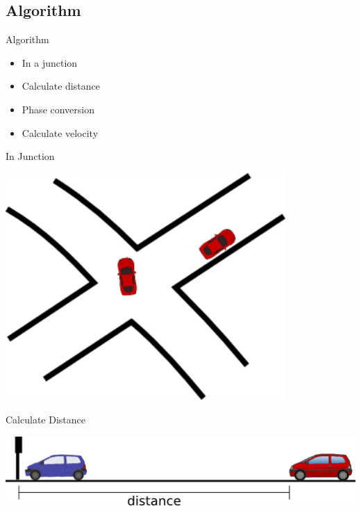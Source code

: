\subsection{Algorithm}
\begin{frame}{Algorithm}
\begin{itemize}
\item In a junction
\item Calculate distance
\item Phase conversion
\item Calculate velocity
\end{itemize}
\end{frame}
\begin{frame}{In Junction}
\begin{center}
\includegraphics[width=0.8\textwidth]{images/algjuction.png}
\end{center}
\end{frame}

\begin{frame}{Calculate Distance}
\begin{center}
\includegraphics[width=1\textwidth]{images/algdistance.png}
\end{center}
\end{frame}

